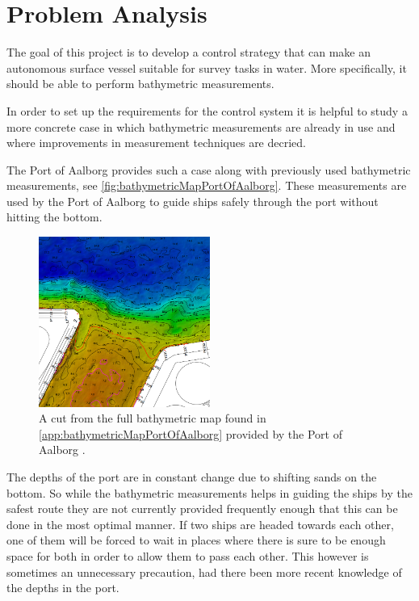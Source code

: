 \chapter{Problem Analysis}
%
The goal of this project is to develop a control strategy that can make an autonomous surface vessel suitable for survey tasks in water. More specifically, it should be able to perform bathymetric measurements.

In order to set up the requirements for the control system it is helpful to study a more concrete case in which bathymetric measurements are already in use and where improvements in measurement techniques are decried.

The Port of Aalborg provides such a case along with previously used bathymetric measurements, see \autoref{fig:bathymetricMapPortOfAalborg}. These measurements are used by the Port of Aalborg to guide ships safely through the port without hitting the bottom.

\begin{figure}[H]
  \includegraphics[width=0.5\textwidth]{figures/smallDebthMapAalborg}
  \caption{A cut from the full bathymetric map found in \autoref{app:bathymetricMapPortOfAalborg} provided by the Port of Aalborg .}
  \label{fig:bathymetricMapPortOfAalborg}
\end{figure}

The depths of the port are in constant change due to shifting sands on the bottom. So while the bathymetric measurements helps in guiding the ships by the safest route they are not currently provided frequently enough that this can be done in the most optimal manner. If two ships are headed towards each other, one of them will be forced to wait in places where there is sure to be enough space for both in order to allow them to pass each other. This however is sometimes an unnecessary precaution, had there been more recent knowledge of the depths in the port.

